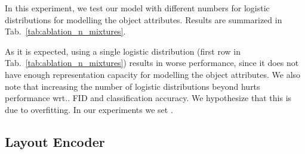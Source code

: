 \documentclass{article}
\makeatletter
\DeclareRobustCommand\onedot{\futurelet\@let@token\@onedot}
\def\@onedot{\ifx\@let@token.\else.\null\fi\xspace}
\def\wrt{wrt\onedot}
\newcommand{\tabref}[1]{Tab.~\ref{#1}}
\makeatother
\begin{document}
In this experiment, we test our model with different numbers for logistic distributions for
modelling the object attributes. Results are summarized in
\tabref{tab:ablation_n_mixtures}.
\begin{table}[!h]
    \centering
    \vspace{0.6em}
    \caption{{\bf Ablation Study on the Number of Logistic Distributions.} This
    table shows a quantitative comparison of our approach with different
    numbers of  logistic distributions for modelling the size, the location
    and the orientation of each object.}
    \label{tab:ablation_n_mixtures}
    \vspace{-1.2em}
\end{table}


As it is expected, using a single logistic distribution (first row in
\tabref{tab:ablation_n_mixtures}) results in worse performance, since it
does not have enough representation capacity for modelling the object
attributes. We also note that increasing the number of logistic
distributions beyond  hurts performance \wrt FID and
classification accuracy. We hypothesize that this is due to overfitting. In our
experiments we set .

\subsection{Layout Encoder}
\label{subsec:layout_encoder}
\end{document}
